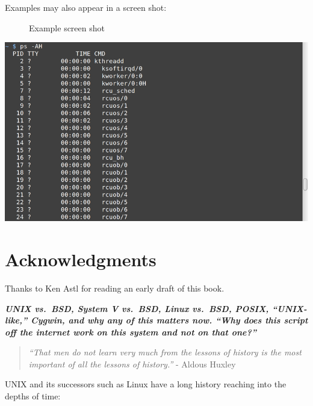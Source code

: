 \documentclass[10pt,]{book}
\numberwithin{figure}{chapter}
\DeclareRobustCommand{\drcap}[1]{\begin{figure}[H]\caption{#1}\end{figure}}
\begin{document}
Examples may also appear in a screen shot:

\drcap{Example screen shot} \includegraphics{./images/ps-AH.png}

\section{Acknowledgments}\label{acknowledgments}

Thanks to Ken Astl for reading an early draft of this book.


\textbf{\emph{UNIX vs.~BSD, System V vs.~BSD, Linux vs.~BSD, POSIX,
``UNIX-like,'' Cygwin, and why any of this matters now. ``Why does this
script off the internet work on this system and not on that one?''}}

\begin{quote}
\emph{``That men do not learn very much from the lessons of history is
the most important of all the lessons of history.''} - Aldous Huxley
\end{quote}

UNIX and its successors such as Linux have a long history reaching into
the depths of time:
\end{document}
